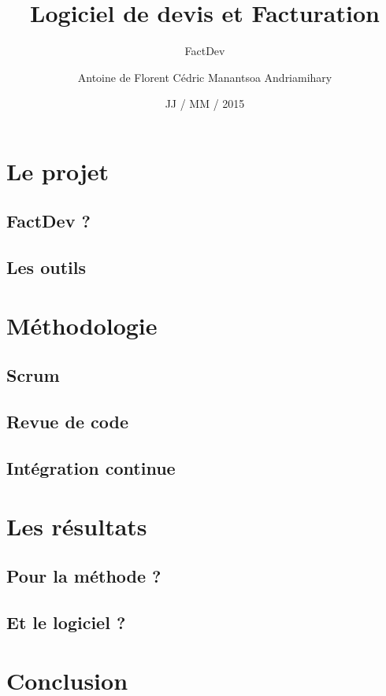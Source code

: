 \documentclass{beamer}
\title[] %
{Logiciel de devis et Facturation}
\subtitle {FactDev}
\author[
\textbf{F}lorent\\
\textbf{A}ntoine\\
\textbf{C}édric\\
Manan\textbf{T}soa
] %
{Antoine de \bsc{Roquemaurel}\newline Florent \bsc{Berbie}\newline Cédric \bsc{Rohaut}\newline Manantsoa Andriamihary \bsc{Razanajatovo}}
\institute[] %
{
Universit\'e Toulouse III -- Paul Sabatier \\
M1 Informatique -- Développement Logiciel 
\vspace{-10px}
}
\date[ ~ ~ ~ JJ / MM / 2015] %
{JJ / MM / 2015}
\begin{document}
\begin{frame}
	\titlepage
\end{frame}
\section{Le projet}
\subsection{FactDev ?}
\subsection{Les outils}
\section{Méthodologie}
\subsection{Scrum}
\subsection{Revue de code}
\subsection{Intégration continue}

\section{Les résultats}
\subsection{Pour la méthode ?}

\subsection{Et le logiciel ?}

\section*{Conclusion}

\begin{frame}
	
\end{frame}
\end{document}

